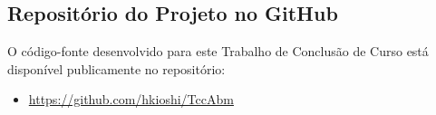 \documentclass[
    12pt,
    openright,
    oneside,
    a4paper,
    english,
    brazil
]{abntex2}
\begin{document}


\begin{apendicesenv}

\chapter{Repositório do Projeto no GitHub}
\label{ap:repositorio}

O código-fonte desenvolvido para este Trabalho de Conclusão de Curso está disponível publicamente no repositório:

\begin{itemize}
\item \url{https://github.com/hkioshi/TccAbm}
\end{itemize}

\end{apendicesenv}
\end{document}
